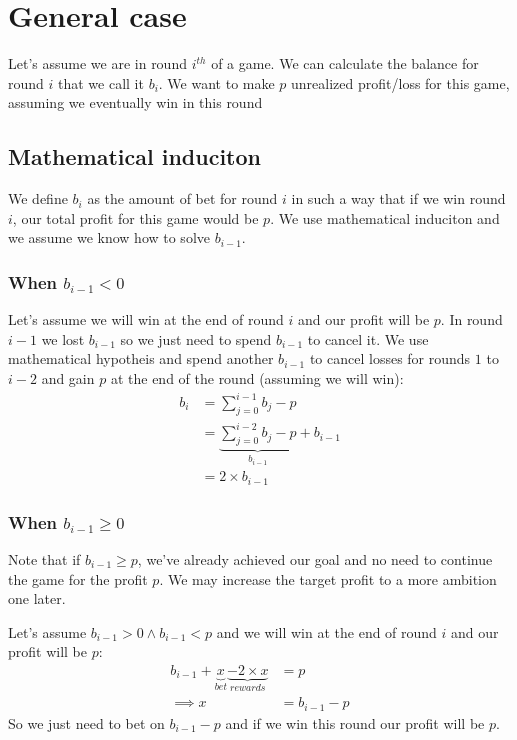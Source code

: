 \documentclass{book}
\begin{document}
	\section{General case}
	Let's assume we are in round $i^{th}$ of a game. We can calculate the balance for round $i$ that we call it $b_i$. We want to make $p$ unrealized profit/loss for this game, assuming we eventually win in this round
	\subsection{Mathematical induciton}
	We define $b_i$ as the amount of bet for round $i$ in such a way that if we win round $i$, our total profit for this game would be $p$. We use mathematical induciton and we assume we know how to solve $b_{i - 1}$.
	\subsubsection{When $b_{i - 1} < 0$}
	Let's assume we will win at the end of round $i$ and our profit will be $p$. In round $i - 1$ we lost $b_{i - 1}$ so we just need to spend $b_{i - 1}$ to cancel it. We use mathematical hypotheis and spend another $b_{i - 1}$ to cancel losses for rounds $1$ to $i - 2$ and gain $p$ at the end of the round (assuming we will win): 
	\begin{equation*}
		\begin{split}
			b_i &= \sum_{j = 0}^{i - 1}{b_j} - p \\
			&= \underbrace{\sum_{j = 0}^{i - 2}{b_j} - p}_{b_{i - 1}} + b_{i - 1} \\
			&= 2 \times b_{i - 1}
		\end{split}
	\end{equation*}
	\subsubsection{When $b_{i - 1} \ge 0$}
	Note that if $b_{i - 1} \ge p$, we've already achieved our goal and no need to continue the game for the profit $p$. We may increase the target profit to a more ambition one later.
	\par Let's assume $b_{i - 1} > 0 \land b_{i - 1} < p$ and we will win at the end of round $i$ and our profit will be $p$:
	\begin{equation*}
		\begin{split}
			b_{i - 1} + \underbrace{x}_{bet} \underbrace{- 2 \times x}_{rewards} &=  p \\
			\implies x &= b_{i - 1} - p
		\end{split}
	\end{equation*}
	So we just need to bet on $b_{i - 1} - p$ and if we win this round our profit will be $p$.
\end{document}
